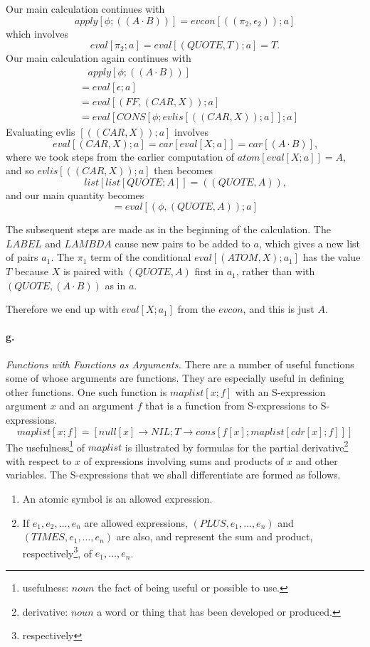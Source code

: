 \documentclass[11pt, a4paper]{article}
\begin{document}
Our main calculation continues with
$$ apply[\phi; ((A \cdot B))] = evcon[((\pi_2, \epsilon_2)); a] $$
which involves
$$ eval[\pi_2; a] = eval[(QUOTE, T); a] = T \text{.} $$
Our main calculation again continues with
\begin{align*}
  &\ \ \ \ apply[\phi; ((A \cdot B))] \\
  &= eval[\epsilon; a]                \\
  &= eval[(FF, (CAR, X)); a]          \\
  &= eval[CONS[\phi; evlis[((CAR, X)); a]]; a]
\end{align*}
Evaluating evlis $[((CAR, X)); a]$ involves
$$ eval[(CAR, X); a] = car[eval[X; a]] = car[(A \cdot B)] \text{,} $$
where we took steps from the earlier computation of $atom[eval[X; a]] = A$, and
so $evlis[((CAR, X)); a]$ then becomes
$$ list[list[QUOTE; A]] = ((QUOTE, A)) \text{,} $$
and our main quantity becomes
$$ = eval[(\phi, (QUOTE, A)); a] $$

The subsequent steps are made as in the beginning of the calculation. The
$LABEL$ and $LAMBDA$ cause new pairs to be added to $a$, which gives a new list
of pairs $a_1$. The $\pi_1$ term of the conditional $eval[(ATOM, X); a_1]$ has
the value $T$ because $X$ is paired with $(QUOTE, A)$ first in $a_1$, rather
than with $(QUOTE, (A \cdot B))$ as in $a$.

Therefore we end up with $eval[X; a_1]$ from the $evcon$, and this is just $A$.

\paragraph{g.}\textit{Functions with Functions as Arguments.}
There are a number of useful functions some of whose arguments are
functions. They are especially useful in defining other functions. One such
function is $maplist[x; f]$ with an S-expression argument $x$ and an argument
$f$ that is a function from S-expressions to S-expressions.
$$ maplist[x; f] = [null[x] \to NIL; T \to cons[f[x]; maplist[cdr[x]; f]]] $$
The
usefulness\footnote{usefulness: $noun$ the fact of being useful or possible to use.}
of $maplist$ is illustrated by formulas for the partial
derivative\footnote{derivative: $noun$ a word or thing that has been developed
  or produced.}
with respect to $x$ of expressions involving sums and products of $x$
and other variables. The S-expressions that we shall differentiate are formed as
follows.
\begin{enumerate}
\item An atomic symbol is an allowed expression.
\item If $e_1, e_2, \ldots, e_n$ are allowed expressions, $(PLUS, e_1, \ldots,
  e_n)$ and \\$(TIMES, e_1, \ldots, e_n)$ are also, and represent the sum and
  product,
  respectively\footnote{respectively},
  of $e_1, \ldots, e_n$.
\end{enumerate}
\end{document}
